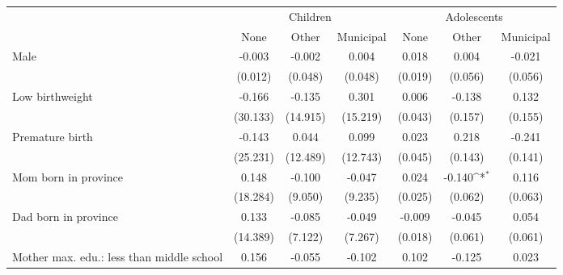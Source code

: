 {
\def\sym#1{\ifmmode^{#1}\else\(^{#1}\)\fi}
\begin{tabular}{l*{6}{c}}
\toprule
			& \multicolumn{3}{c}{Children} & \multicolumn{3}{c}{Adolescents} \\
                    &\multicolumn{1}{c}{None}&\multicolumn{1}{c}{Other}&\multicolumn{1}{c}{Municipal}&\multicolumn{1}{c}{None}&\multicolumn{1}{c}{Other}&\multicolumn{1}{c}{Municipal}\\
\midrule
Male                &      -0.003         &      -0.002         &       0.004         &       0.018         &       0.004         &      -0.021         \\
                    &     (0.012)         &     (0.048)         &     (0.048)         &     (0.019)         &     (0.056)         &     (0.056)         \\
\addlinespace
Low birthweight     &      -0.166         &      -0.135         &       0.301         &       0.006         &      -0.138         &       0.132         \\
                    &    (30.133)         &    (14.915)         &    (15.219)         &     (0.043)         &     (0.157)         &     (0.155)         \\
\addlinespace
Premature birth     &      -0.143         &       0.044         &       0.099         &       0.023         &       0.218         &      -0.241         \\
                    &    (25.231)         &    (12.489)         &    (12.743)         &     (0.045)         &     (0.143)         &     (0.141)         \\
\addlinespace
Mom born in province&       0.148         &      -0.100         &      -0.047         &       0.024         &      -0.140\sym{*}  &       0.116         \\
                    &    (18.284)         &     (9.050)         &     (9.235)         &     (0.025)         &     (0.062)         &     (0.063)         \\
\addlinespace
Dad born in province&       0.133         &      -0.085         &      -0.049         &      -0.009         &      -0.045         &       0.054         \\
                    &    (14.389)         &     (7.122)         &     (7.267)         &     (0.018)         &     (0.061)         &     (0.061)         \\
\addlinespace
Mother max. edu.: less than middle school&       0.156         &      -0.055         &      -0.102         &       0.102         &      -0.125         &       0.023         \\

\end{tabular}}
